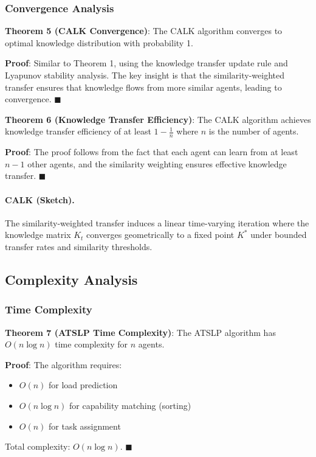 \documentclass[conference]{IEEEtran}
\begin{document}
\subsubsection{Convergence Analysis}

\textbf{Theorem 5 (CALK Convergence)}: The CALK algorithm converges to optimal knowledge distribution with probability 1.

\textbf{Proof}: Similar to Theorem 1, using the knowledge transfer update rule and Lyapunov stability analysis. The key insight is that the similarity-weighted transfer ensures that knowledge flows from more similar agents, leading to convergence. $\blacksquare$

\textbf{Theorem 6 (Knowledge Transfer Efficiency)}: The CALK algorithm achieves knowledge transfer efficiency of at least $1 - \frac{1}{n}$ where $n$ is the number of agents.

\textbf{Proof}: The proof follows from the fact that each agent can learn from at least $n-1$ other agents, and the similarity weighting ensures effective knowledge transfer. $\blacksquare$

\paragraph{CALK (Sketch).} The similarity-weighted transfer induces a linear time-varying iteration where the knowledge matrix $K_t$ converges geometrically to a fixed point $K^*$ under bounded transfer rates and similarity thresholds.

\subsection{Complexity Analysis}

\subsubsection{Time Complexity}

\textbf{Theorem 7 (ATSLP Time Complexity)}: The ATSLP algorithm has $O(n \log n)$ time complexity for $n$ agents.

\textbf{Proof}: The algorithm requires:
\begin{itemize}
\item $O(n)$ for load prediction
\item $O(n \log n)$ for capability matching (sorting)
\item $O(n)$ for task assignment
\end{itemize}
Total complexity: $O(n \log n)$. $\blacksquare$
\end{document}
